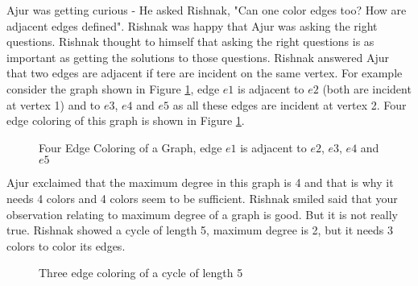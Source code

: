 Ajur was getting curious - He asked Rishnak, "Can one color edges too? How are adjacent edges defined". Rishnak was happy that Ajur was asking the right questions. Rishnak thought to himself that asking the right questions is as important as getting the solutions to those questions. Rishnak answered Ajur that two edges are adjacent if tere are incident on the same vertex. For example consider the graph shown in Figure \ref{10g5},
edge $e1$ is adjacent to $e2$ (both are incident at vertex 1) and to $e3$, $e4$ and $e5$ as all these edges are incident at vertex 2. Four edge coloring of this graph is shown in Figure \ref{10g5}. 

\begin{figure}
\begin{center}


\caption{Four Edge Coloring of a Graph, edge $e1$ is adjacent to $e2$, $e3$,
$e4$ and $e5$}\label{10g5}
\end{center}
\end{figure}

Ajur exclaimed that the maximum degree in this graph is 4 and that is why it needs 4 colors and 4 colors seem to be sufficient. Rishnak smiled said that your observation relating to maximum degree of a graph is good. But it is not really true. Rishnak showed a cycle of length 5, maximum degree is 2, but it needs 3 colors to color its edges.

\begin{figure}
\begin{center}


\caption{Three edge coloring of a cycle of length 5 }\label{10g6}
\end{center}
\end{figure}

